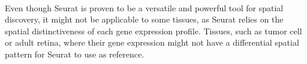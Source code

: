\paragraph{}
Even though Seurat is proven to be a versatile and powerful tool for spatial discovery, it might not be applicable to some tissues, as Seurat relies on the spatial distinctiveness of each gene expression profile. Tissues, such as tumor cell or adult retina, where their gene expression might not have a differential spatial pattern for Seurat to use as reference.    
